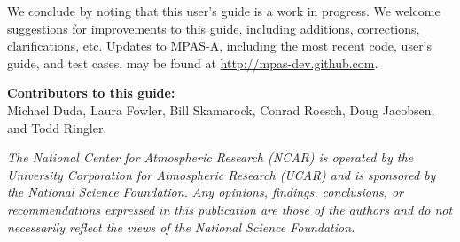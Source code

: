 We conclude by noting that this user's guide is a work in progress.  We welcome suggestions for improvements to this guide, including additions, corrections, clarifications, etc.  Updates to MPAS-A, including the most recent code,
user's guide, and test cases, may be found at \hfil\break \url{http://mpas-dev.github.com}.

\vspace{8pt}
\noindent
{\bf Contributors to this guide:}\\
Michael Duda, Laura Fowler, Bill Skamarock, Conrad Roesch, Doug Jacobsen, and Todd Ringler.


\vfil
\noindent
{\it The National Center for Atmospheric Research (NCAR) is operated by the
University Corporation for Atmospheric Research (UCAR) and is sponsored by the
National Science Foundation.  Any opinions, findings, conclusions, or
recommendations expressed in this publication are those of the authors and do
not necessarily reflect the views of the National Science Foundation.}
